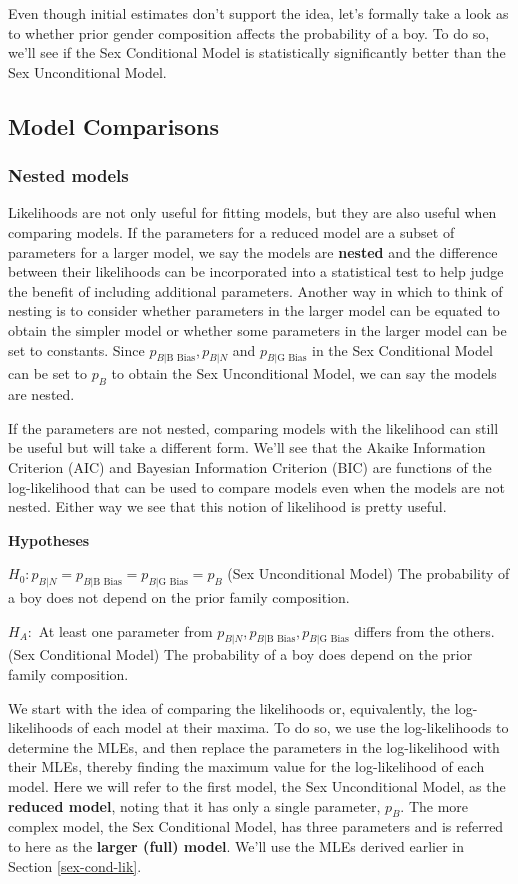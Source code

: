 \documentclass[
]{krantz}
\newcommand{\neutral}{p_{B|N}}
\newcommand{\gbias}{p_{B|\textrm{G Bias}}}
\newcommand{\bbias}{p_{B|\textrm{B Bias}}}
\begin{document}
Even though initial estimates don't support the idea, let's formally take a look as to whether prior gender composition affects the probability of a boy. To do so, we'll see if the Sex Conditional Model is statistically significantly better than the Sex Unconditional Model.

\subsection{Model Comparisons}\label{sec-lrtest}

\subsubsection{Nested models}\label{nested-models}

Likelihoods are not only useful for fitting models, but they are also useful when comparing models. If the parameters for a reduced model are a subset of parameters for a larger model, we say the models are \textbf{nested}  and the difference between their likelihoods can be incorporated into a statistical test to help judge the benefit of including additional parameters. Another way in which to think of nesting is to consider whether parameters in the larger model can be equated to obtain the simpler model or whether some parameters in the larger model can be set to constants. Since \(\bbias, \neutral\) and \(\gbias\) in the Sex Conditional Model can be set to \(p_B\) to obtain the Sex Unconditional Model, we can say the models are nested.

If the parameters are not nested, comparing models with the likelihood can still be useful but will take a different form. We'll see that the Akaike Information Criterion (AIC) and Bayesian Information Criterion (BIC) are functions of the log-likelihood that can be used to compare models even when the models are not nested. Either way we see that this notion of likelihood is pretty useful.

\textbf{Hypotheses}

\(H_0: \neutral=\bbias=\gbias=p_B\) (Sex Unconditional Model)
The probability of a boy does not depend on the prior family composition.

\(H_A:\) At least one parameter from \(\neutral, \bbias,\gbias\) differs from the others. (Sex Conditional Model)
The probability of a boy does depend on the prior family composition.

We start with the idea of comparing the likelihoods or, equivalently, the log-likelihoods of each model at their maxima. To do so, we use the log-likelihoods to determine the MLEs, and then replace the parameters in the log-likelihood with their MLEs, thereby finding the maximum value for the log-likelihood of each model. Here we will refer to the first model, the Sex Unconditional Model, as the \textbf{reduced model},  noting that it has only a single parameter, \(p_B\). The more complex model, the Sex Conditional Model, has three parameters and is referred to here as the \textbf{larger (full) model}. We'll use the MLEs derived earlier in Section \ref{sex-cond-lik}.
\end{document}

